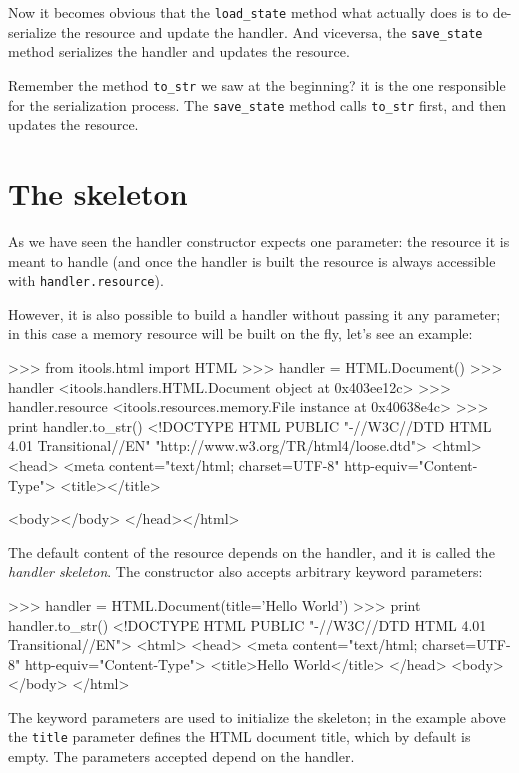 Now it becomes obvious that the {\tt load\_state} method what actually
does is to de-serialize the resource and update the handler. And viceversa,
the {\tt save\_state} method serializes the handler and updates the resource.

Remember the method {\tt to\_str} we saw at the beginning? it is the one
responsible for the serialization process. The {\tt save\_state} method
calls {\tt to\_str} first, and then updates the resource.


\section{The skeleton}

As we have seen the handler constructor expects one parameter: the resource
it is meant to handle (and once the handler is built the resource is always
accessible with {\tt handler.resource}).

However, it is also possible to build a handler without passing it any
parameter; in this case a memory resource will be built on the fly, let's
see an example:

\begin{code}
    >>> from itools.html import HTML
    >>> handler = HTML.Document()
    >>> handler
    <itools.handlers.HTML.Document object at 0x403ee12c>
    >>> handler.resource
    <itools.resources.memory.File instance at 0x40638e4c>
    >>> print handler.to_str()
    <!DOCTYPE HTML PUBLIC "-//W3C//DTD HTML 4.01 Transitional//EN"
      "http://www.w3.org/TR/html4/loose.dtd">
    <html>
      <head>
        <meta content="text/html; charset=UTF-8" http-equiv="Content-Type">
        <title></title>
      
      <body></body>
    </head></html>
\end{code}

The default content of the resource depends on the handler, and it is called
the {\em handler skeleton}. The constructor also accepts arbitrary keyword
parameters:

\begin{code}
    >>> handler = HTML.Document(title='Hello World')
    >>> print handler.to_str()
    <!DOCTYPE HTML PUBLIC "-//W3C//DTD HTML 4.01 Transitional//EN">
    <html>
      <head>
        <meta content="text/html; charset=UTF-8" http-equiv="Content-Type">
        <title>Hello World</title>
      </head>
      <body></body>
    </html>
\end{code}

The keyword parameters are used to initialize the skeleton; in the example
above the {\tt title} parameter defines the HTML document title, which by
default is empty. The parameters accepted depend on the handler.


